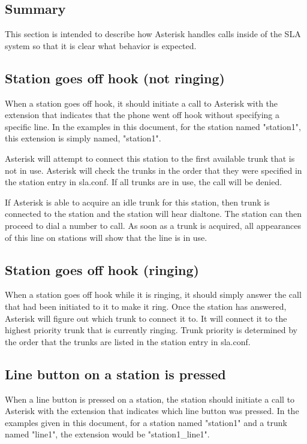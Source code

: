 \documentclass[12pt,a4]{article}
\begin{document}
\subsection{Summary}

This section is intended to describe how Asterisk handles calls inside of the
SLA system so that it is clear what behavior is expected.

\subsection{Station goes off hook (not ringing)}

When a station goes off hook, it should initiate a call to Asterisk with the
extension that indicates that the phone went off hook without specifying a
specific line.  In the examples in this document, for the station named
"station1", this extension is simply named, "station1".

Asterisk will attempt to connect this station to the first available trunk
that is not in use.  Asterisk will check the trunks in the order that they
were specified in the station entry in sla.conf.  If all trunks are in use,
the call will be denied.

If Asterisk is able to acquire an idle trunk for this station, then trunk
is connected to the station and the station will hear dialtone.  The station
can then proceed to dial a number to call.  As soon as a trunk is acquired,
all appearances of this line on stations will show that the line is in use.

\subsection{Station goes off hook (ringing)}

When a station goes off hook while it is ringing, it should simply answer
the call that had been initiated to it to make it ring.  Once the station
has answered, Asterisk will figure out which trunk to connect it to.  It
will connect it to the highest priority trunk that is currently ringing.
Trunk priority is determined by the order that the trunks are listed in
the station entry in sla.conf.

\subsection{Line button on a station is pressed}

When a line button is pressed on a station, the station should initiate a
call to Asterisk with the extension that indicates which line button was
pressed.  In the examples given in this document, for a station named
"station1" and a trunk named "line1", the extension would be "station1\_line1".
\end{document}
